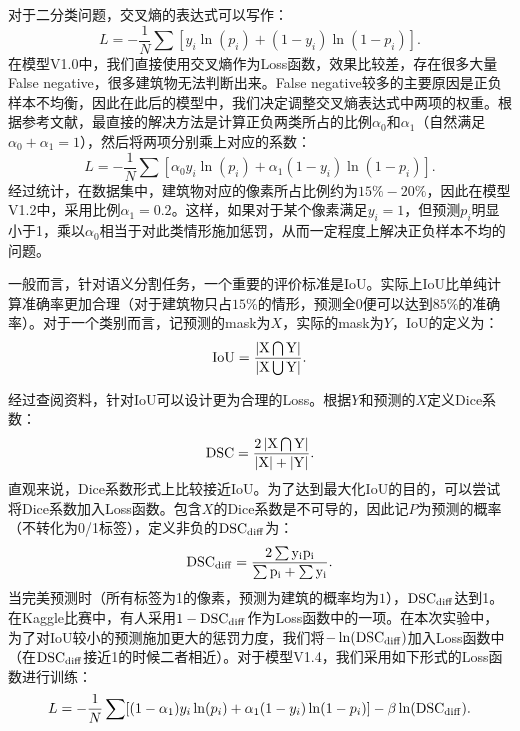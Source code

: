 \documentclass[a4paper,12pt]{article}
\begin{document}
\begin{CJK*}{UTF8}{gbsn}
\begin{spacing}{1.2}
    对于二分类问题，交叉熵的表达式可以写作：
    \begin{equation}
    L = -\frac{1}{N}\sum[y_{i}\ln(p_{i}) + (1-y_{i})\ln(1-p_{i})].
    \end{equation}
    在模型V1.0中，我们直接使用交叉熵作为Loss函数，效果比较差，存在很多大量False negative，很多建筑物无法判断出来。False negative较多的主要原因是正负样本不均衡，因此在此后的模型中，我们决定调整交叉熵表达式中两项的权重。根据参考文献\cite{}，最直接的解决方法是计算正负两类所占的比例$\alpha_{0}$和$\alpha_{1}$（自然满足$\alpha_{0}+\alpha_{1}=1$），然后将两项分别乘上对应的系数：
    \begin{equation}
    L = -\frac{1}{N}\sum[\alpha_{0}y_{i}\ln(p_{i}) + \alpha_{1} (1-y_{i})\ln(1-p_{i})].
    \end{equation}
    经过统计，在数据集中，建筑物对应的像素所占比例约为$15\%-20\%$，因此在模型V1.2中，采用比例$\alpha_{1}=0.2$。这样，如果对于某个像素满足$y_{i}=1$，但预测${p_{i}}$明显小于1，乘以$\alpha_{0}$相当于对此类情形施加惩罚，从而一定程度上解决正负样本不均的问题。
    
    一般而言，针对语义分割任务，一个重要的评价标准是IoU。实际上IoU比单纯计算准确率更加合理（对于建筑物只占$15\%$的情形，预测全0便可以达到$85\%$的准确率）。对于一个类别而言，记预测的mask为$X$，实际的mask为$Y$，IoU的定义为：
    \begin{equation}
    \rm{IoU} = \frac{\left |{X}\bigcap{Y}\right |}{\left |{X}\bigcup{Y}\right |}.
    \end{equation}
    
    经过查阅资料\cite{}，针对IoU可以设计更为合理的Loss。根据$Y$和预测的$X$定义Dice系数：
    \begin{equation}
    \rm{DSC} = \frac{2 \left |{X}\bigcap{Y}\right |}{\left |X \right |+ \left |Y\right |}.
    \end{equation}
    直观来说，Dice系数形式上比较接近IoU。为了达到最大化IoU的目的，可以尝试将Dice系数加入Loss函数。包含$X$的Dice系数是不可导的，因此记$P$为预测的概率（不转化为0/1标签），定义非负的$\rm{DSC}_{diff}$为：
    \begin{equation}
    \rm{{DSC}_{diff}} = \frac{2\sum y_{i}p_{i}}{\sum p_{i} + \sum{y_{i}}}.
    \end{equation}
    当完美预测时（所有标签为1的像素，预测为建筑的概率均为$1$），$\rm{DSC}_{diff}$达到1。在Kaggle比赛中，有人采用$1-\rm{DSC}_{diff}$作为Loss函数中的一项。在本次实验中，为了对IoU较小的预测施加更大的惩罚力度，我们将$-\ln(\rm{DSC}_{diff})$加入Loss函数中（在$\rm{DSC}_{diff}$接近1的时候二者相近）。对于模型V1.4，我们采用如下形式的Loss函数进行训练：
    \begin{equation}
    L = -\frac{1}{N}\sum[(1-\alpha_{1})y_{i}\ln(p_{i}) + \alpha_{1} (1-y_{i})\ln(1-p_{i})] - \beta \ln(\rm{DSC}_{diff}).
    \end{equation}
    

\end{spacing}
\end{CJK*}
\end{document}

